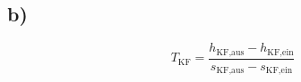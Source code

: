 

\subsection*{b)}

\[
T_{\text{KF}} = \frac{h_{\text{KF,aus}} - h_{\text{KF,ein}}}{s_{\text{KF,aus}} - s_{\text{KF,ein}}}
\]